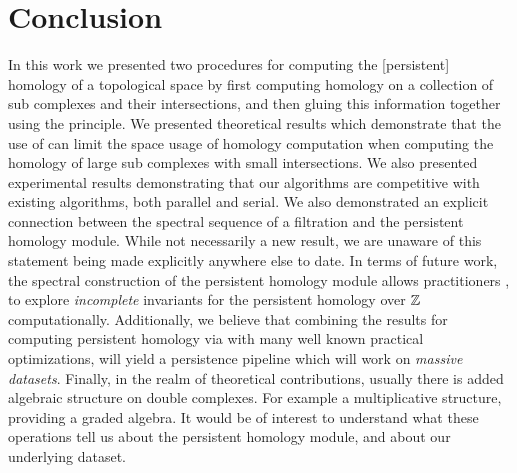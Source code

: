 \chapter{Conclusion}
In this work we presented two procedures for computing the [persistent] homology of a topological space by first computing homology on a collection of sub complexes and their intersections, and then gluing this information together using the \mv principle. We presented theoretical results which demonstrate that the use of \mv can limit the space usage of homology computation when computing the homology of large sub complexes with small intersections. We also presented experimental results demonstrating that our algorithms are competitive with existing algorithms, both parallel and serial. We also demonstrated an explicit connection between the spectral sequence of a filtration and the persistent homology module. While not necessarily a new result, we are unaware of this statement being made explicitly anywhere else to date. In terms of future work, the spectral construction of the persistent homology module allows practitioners , to explore \emph{incomplete} invariants for the persistent homology over $\mathbb{Z}$ computationally. Additionally, we believe that combining the results for computing persistent homology via \mv with many well known practical optimizations, will yield a persistence pipeline which will work on \emph{massive datasets}. Finally, in the realm of theoretical contributions, usually there is added algebraic structure on double complexes. For example a multiplicative structure, providing a graded algebra. It would be of interest to understand what these operations tell us about the persistent homology module, and about our underlying dataset.